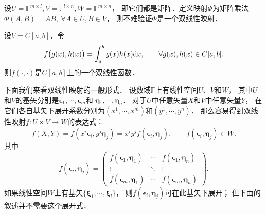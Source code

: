 \begin{example}
    设$U=\mathbb{F}^{m\times l}, V=\mathbb{F}^{l\times n}, W=\mathbb{F}^{m\times n}$，
    即它们都是矩阵．定义映射$\Phi$为矩阵乘法$\Phi(A,B)=AB, \ \forall A\in U, B\in V$，
    则不难验证$\Phi$是一个双线性映射．
\end{example}

\begin{example}
    设$V=C[a,b]$，令
    \begin{equation}
        f\bigl( g(x), h(x)\bigr) = \int_{a}^{b} g(x) h(x) {\rm d}x,
        \qquad \forall g(x), h(x)\in C[a,b].
    \end{equation}
    则$f(\cdot,\cdot)$是$C[a,b]$上的一个双线性函数．
\end{example}


下面我们来看双线性映射的一般形式．
设数域$\mathbb{F}$上有线性空间$U$、$V$和$W$，
其中$U$和$V$的基矢分别是$\boldsymbol{\epsilon}_1, \cdots, \boldsymbol{\epsilon}_m$和
$\boldsymbol{\eta}_1, \cdots, \boldsymbol{\eta}_n$．
对于$U$中任意矢量$X$和$V$中任意矢量$Y$，
在它们各自基矢下展开系数分别为$(x^1,\cdots,x^m)$和$(y^1,\cdots,y^n)$．
那么容易得到双线性映射$f:U\times V \to W$的表达式：
    \begin{equation}\label{chmla:eqn_fxy-expand}
        f(X,Y)  = f\left( x^i \boldsymbol{\epsilon}_i, y^j \boldsymbol{\eta}_j\right)
        = x^i y^j f\left( \boldsymbol{\epsilon}_i,  \boldsymbol{\eta}_j\right) ,
        \qquad f\left( \boldsymbol{\epsilon}_i,  \boldsymbol{\eta}_j\right)  \in W.
    \end{equation}
    其中
    \begin{equation}\label{chmla:eqn_metricij}
        f\left( \boldsymbol{\epsilon}_i,  \boldsymbol{\eta}_j\right) =
        \begin{pmatrix}
            f\left( \boldsymbol{\epsilon}_1,  \boldsymbol{\eta}_1\right)  &  \cdots &
            f\left( \boldsymbol{\epsilon}_1,  \boldsymbol{\eta}_n\right)  \\
            \vdots & \ddots & \vdots \\
            f\left( \boldsymbol{\epsilon}_m,  \boldsymbol{\eta}_1\right)  & \cdots &
            f\left( \boldsymbol{\epsilon}_m,  \boldsymbol{\eta}_n\right)
        \end{pmatrix}.
    \end{equation}
如果线性空间$W$上有基矢$\{\boldsymbol{\xi}_1,\cdots,\boldsymbol{\xi}_l \}$，
则$f\left( \boldsymbol{\epsilon}_i,  \boldsymbol{\eta}_j\right) $可在此基矢下展开；
但下面的叙述并不需要这个展开式．

